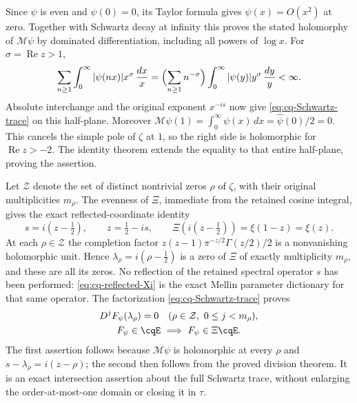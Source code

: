 Since $\psi$ is even and $\psi(0)=0$, its Taylor formula gives
$\psi(x)=O(x^2)$ at zero. Together with Schwartz decay at infinity
this proves the stated holomorphy of $\mathcal M\psi$ by
dominated differentiation, including all powers of $\log x$.
For $\sigma=\operatorname{Re}z>1$,
\[
 \sum_{n\geq1}\int_0^\infty|\psi(nx)|x^\sigma\,\frac{dx}{x}
 =\Bigl(\sum_{n\geq1}n^{-\sigma}\Bigr)
          \int_0^\infty|\psi(y)|y^\sigma\,\frac{dy}{y}<\infty.
\]
Absolute interchange and the original exponent $x^{-is}$ now give
\eqref{eq:cq-Schwartz-trace} on this half-plane. Moreover
$\mathcal M\psi(1)=\int_0^\infty\psi(x)\,dx
=\widehat\psi(0)/2=0$. This cancels the simple pole of $\zeta$
at $1$, so the right side is holomorphic for
$\operatorname{Re}z>-2$. The identity theorem extends the equality
to that entire half-plane, proving the assertion.

Let $\mathcal Z$ denote the set of distinct nontrivial zeros $\rho$
of $\zeta$, with their original multiplicities $m_\rho$.
The evenness of $\Xi$, immediate from the retained cosine integral,
gives the exact reflected-coordinate identity
\begin{equation}\label{eq:cq-reflected-Xi}
 s=i(z-\tfrac12),\qquad z=\tfrac12-is,\qquad
 \Xi(i(z-\tfrac12))=\xi(1-z)=\xi(z).
\end{equation}
At each $\rho\in\mathcal Z$ the completion factor
$z(z-1)\pi^{-z/2}\Gamma(z/2)/2$ is a nonvanishing holomorphic
unit. Hence $\lambda_\rho=i(\rho-\tfrac12)$ is a zero of
$\Xi$ of exactly multiplicity $m_\rho$, and these are all its
zeros. No reflection of the retained spectral operator $s$ has
been performed: \eqref{eq:cq-reflected-Xi} is the exact Mellin
parameter dictionary for that same operator. The factorization
\eqref{eq:cq-Schwartz-trace} proves
\begin{equation}\label{eq:cq-fulltrace-jets}
 \begin{gathered}
 D^jF_\psi(\lambda_\rho)=0
 \quad(\rho\in\mathcal Z,\ 0\leq j<m_\rho),\\
 F_\psi\in\cqE\ \Longrightarrow\ F_\psi\in\Xi\cqE.
 \end{gathered}
\end{equation}
The first assertion follows because $\mathcal M\psi$ is holomorphic
at every $\rho$ and $s-\lambda_\rho=i(z-\rho)$; the second
then follows from the proved division theorem. It is an exact
intersection assertion about the full Schwartz trace, without
enlarging the order-at-most-one domain or closing it in $\tau$.

